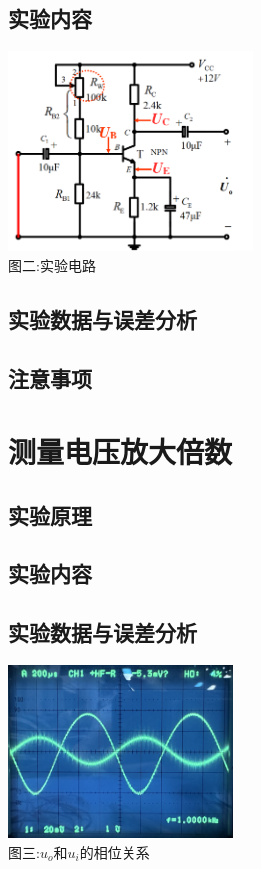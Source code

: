 \documentclass[a4paper]{article}
\begin{document}
    \subsection{实验内容}\label{subsec:2}
    \begin{center}
        \includegraphics[height=150pt]{exp2}\\
        {\small 图二:实验电路}
    \end{center}

    \subsection{实验数据与误差分析}\label{subsec:3}

    \subsection{注意事项}\label{subsec:4}


    \section{测量电压放大倍数}\label{sec:4}

    \subsection{实验原理}\label{subsec:5}

    \subsection{实验内容}\label{subsec:6}

    \subsection{实验数据与误差分析}\label{subsec:7}
    \begin{center}
        \includegraphics[height=130pt]{ref}\\
        {\small 图三:$u_o$和$u_i$的相位关系}
    \end{center}
\end{document}
